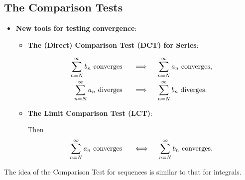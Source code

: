 \subsection{The Comparison Tests}  
\begin{center}
\begin{tcolorbox}
    \begin{itemize}
        \item \textbf{New tools for testing convergence}: 
        \begin{itemize}
            \item \textbf{The (Direct) Comparison Test (DCT) for Series}: 
            \begin{align*}
                \displaystyle\sum_{n=N}^\infty b_n \text{ converges } \quad &\implies  \quad \displaystyle\sum_{n=N}^\infty a_n \text{ converges}, \\
                \displaystyle\sum_{n=N}^\infty a_n \text{ diverges } \quad &\implies  \quad \displaystyle\sum_{n=N}^\infty b_n \text{ diverges}.
            \end{align*}
            \item \textbf{The Limit Comparison Test (LCT)}: 
            Then 
            \[\displaystyle\sum_{n=N}^\infty a_n \text{ converges } \quad \iff \quad \displaystyle\sum_{n=N}^\infty b_n \text{ converges}.\]
        \end{itemize}
    \end{itemize}
\end{tcolorbox}
\end{center}
The idea of the Comparison Test for sequences is similar to that for integrals.

